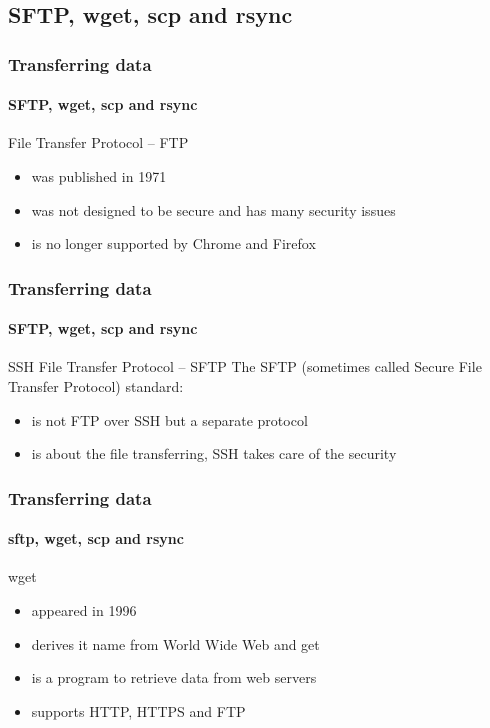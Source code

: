 \documentclass[aspectratio=169,usenames,dvipsnames]{beamer}
\begin{document}
    \subsection{SFTP, wget, scp and rsync}
    \begin{frame}
        \frametitle{Transferring data}
        \framesubtitle{SFTP, wget, scp and rsync}
        \begin{block}{File Transfer Protocol -- FTP}
        \begin{itemize}
            \item was \alert{published in 1971}
            \item was not designed to be secure and has \alert{many security issues}
            \item is \alert{no longer supported by Chrome and Firefox} 
        \end{itemize}
        \end{block}
    \end{frame}
    \begin{frame}
        \frametitle{Transferring data}
        \framesubtitle{SFTP, wget, scp and rsync}
        \begin{block}{SSH File Transfer Protocol -- SFTP}
        The SFTP (sometimes called Secure File Transfer Protocol) standard:
        \begin{itemize}
            \item is not FTP over SSH but a separate protocol
            \item is about the file transferring, SSH takes care of the security 
        \end{itemize}
        \end{block}
    \end{frame}
    \begin{frame}
        \frametitle{Transferring data}
        \framesubtitle{sftp, wget, scp and rsync}
        \begin{block}{wget}
            \begin{itemize}
                \item appeared in 1996
                \item derives it name from World Wide Web and get
                \item is a program to retrieve data from web servers
                \item supports HTTP, HTTPS and FTP
            \end{itemize}
        \end{block}
    \end{frame}
\end{document}
